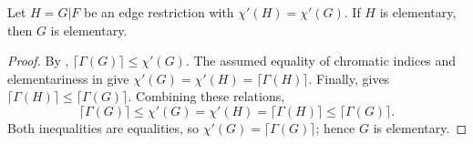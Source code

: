 \begin{lemma}
Let $H=G|F$ be an edge restriction with $\chi'(H)=\chi'(G)$.  If $H$ is
elementary, then $G$ is elementary.
\end{lemma}
\begin{proof}
By ,
$\lceil\Gamma(G)\rceil\le\chi'(G)$.  The assumed equality of chromatic
indices and elementariness in  give
$\chi'(G)=\chi'(H)=\lceil\Gamma(H)\rceil$.  Finally,
 gives
$\lceil\Gamma(H)\rceil\le\lceil\Gamma(G)\rceil$.  Combining these relations,
\[
 \lceil\Gamma(G)\rceil\le\chi'(G)=\chi'(H)
 =\lceil\Gamma(H)\rceil\le\lceil\Gamma(G)\rceil.
\]
Both inequalities are equalities, so
$\chi'(G)=\lceil\Gamma(G)\rceil$; hence $G$ is elementary.
\end{proof}
